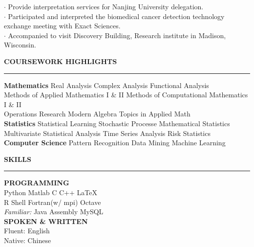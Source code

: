 \documentclass[11pt,A4]{article}
\newcommand{\cvsection}[1]
{
	\begin{center}
		\large\textcolor{sectcol}{\textbf{#1}}
	\end{center}
}
\begin{document}
        $\cdot$ Provide interpretation services for Nanjing University delegation.\\
        $\cdot$ Participated and interpreted the biomedical cancer detection 
                technology exchange meeting with Exact Sciences.\\
        $\cdot$ Accompanied to visit Discovery Building, Research institute in Madison, Wisconsin.\\


\cvsection{COURSEWORK HIGHLIGHTS}
\vspace{-18pt}
\textcolor{softcol}{\hrule}
\vspace{6pt}

\textbf{Mathematics}
Real Analysis \textbullet{} Complex Analysis \textbullet{} Functional Analysis \\
Methods of Applied Mathematics I \& II \textbullet{} Methods of Computational Mathematics I \& II \\
Operations Research \textbullet{} Modern Algebra \textbullet{} Topics in Applied Math\\

\textbf{Statistics}
Statistical Learning \textbullet{} Stochastic Processe \textbullet{} Mathematical Statistics \\
Multivariate Statistical Analysis \textbullet{} Time Series Analysis \textbullet{} Risk Statistics\\

\textbf{Computer Science}
Pattern Recognition \textbullet{} Data Mining \textbullet{} Machine Learning\\


\cvsection{SKILLS}
\vspace{-18pt}
\textcolor{softcol}{\hrule}
\vspace{6pt}

\textbf{PROGRAMMING}\\
Python \textbullet{} Matlab \textbullet{} C \textbullet{} C++ \textbullet{} \LaTeX\ \\
R \textbullet{} Shell \textbullet{} Fortran(w/ mpi) \textbullet{} Octave\\
\textit{Familiar:}
Java \textbullet{} Assembly \textbullet{} MySQL\\

\textbf{SPOKEN \& WRITTEN}\\
Fluent: English \\
Native: Chinese\\
\end{document}
